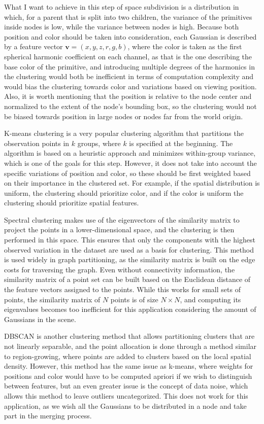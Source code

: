 What I want to achieve in this step of space subdivision is a distribution in which, for a parent that is split into two children, the variance of the primitives inside nodes is low, while the variance between nodes is high. Because both position and color should be taken into consideration, each Gaussian is described by a feature vector $\bm{v} = (x, y, z, r, g, b)$, where the color is taken as the first spherical harmonic coefficient on each channel, as that is the one describing the base color of the primitive, and introducing multiple degrees of the harmonics in the clustering would both be inefficient in terms of computation complexity and would bias the clustering towards color and variations based on viewing position. Also, it is worth mentioning that the position is relative to the node center and normalized to the extent of the node's bounding box, so the clustering would not be biased towards position in large nodes or nodes far from the world origin.

K-means clustering \cite{kmeans} is a very popular clustering algorithm that partitions the observation points in $k$ groups, where $k$ is specified at the beginning. The algorithm is based on a heuristic approach and minimizes within-group variance, which is one of the goals for this step. However, it does not take into account the specific variations of position and color, so these should be first weighted based on their importance in the clustered set. For example, if the spatial distribution is uniform, the clustering should prioritize color, and if the color is uniform the clustering should prioritize spatial features. 

Spectral clustering \cite{spectral} makes use of the eigenvectors of the similarity matrix to project the points in a lower-dimensional space, and the clustering is then performed in this space. This ensures that only the components with the highest observed variation in the dataset are used as a basis for clustering. This method is used widely in graph partitioning, as the similarity matrix is built on the edge costs for traversing the graph. Even without connectivity information, the similarity matrix of a point set can be built based on the Euclidean distance of the feature vectors assigned to the points. While this works for small sets of points, the similarity matrix of $N$ points is of size $N \times N$, and computing its eigenvalues becomes too inefficient for this application considering the amount of Gaussians in the scene. 

DBSCAN \cite{dbscan} is another clustering method that allows partitioning clusters that are not linearly separable, and the point allocation is done through a method similar to region-growing, where points are added to clusters based on the local spatial density. However, this method has the same issue as k-means, where weights for positions and color would have to be computed apriori if we wish to distinguish between features, but an even greater issue is the concept of data noise, which allows this method to leave outliers uncategorized. This does not work for this application, as we wish all the Gaussians to be distributed in a node and take part in the merging process.

